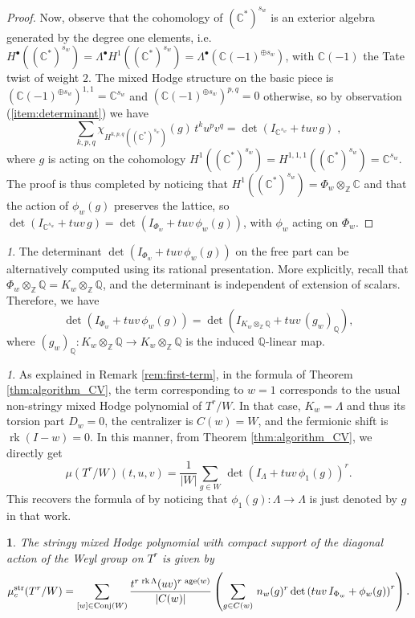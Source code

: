 \documentclass[11pt,english]{amsart}
\numberwithin{equation}{section}
\numberwithin{figure}{section}
\theoremstyle{plain}
\newtheorem{cor}[thm]{\protect\corollaryname}
\theoremstyle{plain}
\theoremstyle{definition}
\theoremstyle{remark}
\newtheorem{rem}[thm]{\protect\remarkname}
\newcommand{\ZZ}{\mathbb{Z}}
\newcommand{\CC}{\mathbb{C}}
\newcommand{\QQ}{\mathbb{Q}}
\newcommand{\rk}{\operatorname{rk}}
\newcommand{\age}{\operatorname{age}}
\newcommand{\str}{\textup{str}}
\providecommand{\corollaryname}{Corollary}
\providecommand{\remarkname}{Remark}
\begin{document}
\begin{proof}
Now, observe that the cohomology of $(\CC^*)^{s_w}$ is an exterior algebra generated by the degree one elements, i.e.\ $H^\bullet((\CC^*)^{s_w}) = \Lambda^\bullet H^1((\CC^*)^{s_w}) = \Lambda^\bullet(\CC(-1)^{\oplus s_w})$, with $\CC(-1)$ the Tate twist of weight $2$. The mixed Hodge structure on the basic piece is $(\CC(-1)^{\oplus s_w})^{1,1} = \CC^{s_w}$ and $(\CC(-1)^{\oplus s_w})^{p,q} = 0$ otherwise, so by observation (\ref{item:determinant}) we have
$$
\sum_{k,p,q} \chi_{H^{k,p,q}((\CC^*)^{s_w})}(g)\,t^ku^pv^q = \det(I_{\CC^{s_w}} + tuv\,g)\; ,
$$
where $g$ is acting on the cohomology $H^{1}((\CC^*)^{s_w})=H^{1,1,1}((\CC^*)^{s_w}) = \CC^{s_w}$. The proof is thus completed by noticing that $H^{1}((\CC^*)^{s_w}) = \Phi_w \otimes_{\ZZ} \CC$ and that the action of $\phi_w(g)$ preserves the lattice, so \linebreak $\det(I_{\CC^{s_w}} + tuv\,g) = \det(I_{\Phi_w} + tuv\,\phi_w(g))$, with $\phi_w$ acting on $\Phi_w$.
\end{proof}

\begin{rem}\label{rmk:rational-det}
    The determinant $\det\left(I_{\Phi_w} + tuv\,\phi_w(g)\right)$ on the free part can be alternatively computed using its rational presentation. More explicitly, recall that $\Phi_w \otimes_\ZZ \QQ = K_w \otimes_\ZZ \QQ$, and the determinant is independent of extension of scalars. Therefore, we have
    $$\det\left(I_{\Phi_w} + tuv\,\phi_w(g)\right) = \det\left(I_{K_{w} \otimes_\ZZ \QQ} + tuv\,(g_{w})_\QQ\right),
    $$
    where $(g_w)_\QQ: K_w \otimes_\ZZ \QQ \to K_w \otimes_\ZZ \QQ $ is the induced $\QQ$-linear map.
\end{rem}

\begin{rem}\label{rmk:w-1}
As explained in Remark \ref{rem:first-term}, in the formula of Theorem \ref{thm:algorithm_CV}, the term corresponding to $w = 1$ corresponds to the usual non-stringy mixed Hodge polynomial of $T^r/W$. In that case, $K_{w} = \Lambda$ and thus its torsion part $D_w = 0$, the centralizer is $C(w)=W$, and the fermionic shift is $\rk (I-w) = 0$. In this manner, from Theorem \ref{thm:algorithm_CV}, we directly get
    \[
        \mu(T^r/W)(t,u,v)=
        \frac{1}{|W|}\sum_{g \in W} \, \det\left(I_{{\Lambda}} + tuv\,\phi_1(g)\right)^r.
    \]
This recovers the formula of \cite[Theorem 5.2]{FS} by noticing that $\phi_1(g): \Lambda \to \Lambda$ is just denoted by $g$ in that work.
\end{rem}

\begin{cor}\label{cor:compact-support}
    The stringy mixed Hodge polynomial with compact support of the diagonal action of the Weyl group on $T^r$ is given by 
    \[
        \mu^{\str}_c(T^r/W)=\sum_{[w] \in \textup{Conj}(W)}
        \frac{t^{r\,\rk \Lambda}(uv)^{r\, \age(w)}}{|C(w)|}\left(\sum_{g \in C(w)} \, n_{w}(g)^r \det\left(tuv\,I_{\Phi_w} + \phi_w(g)\right)^r \right)
        .
    \]
\end{cor}
\end{document}
